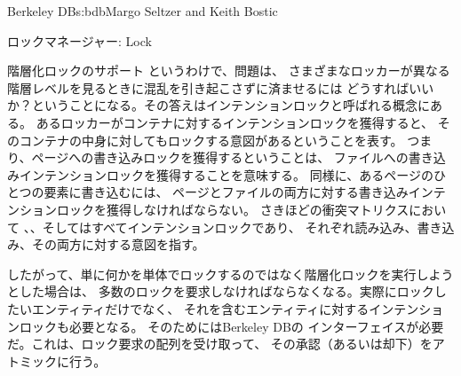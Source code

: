 \begin{aosachapter}{Berkeley DB}{s:bdb}{Margo Seltzer and Keith Bostic}
\begin{aosasect1}{ロックマネージャー: Lock}
\begin{aosasect2}{階層化ロックのサポート}
というわけで、問題は、
さまざまなロッカーが異なる階層レベルを見るときに混乱を引き起こさずに済ませるには
どうすればいいか？ということになる。その答えはインテンションロックと呼ばれる概念にある。
あるロッカーがコンテナに対するインテンションロックを獲得すると、
そのコンテナの中身に対してもロックする意図があるということを表す。
つまり、ページへの書き込みロックを獲得するということは、
ファイルへの書き込みインテンションロックを獲得することを意味する。
同様に、あるページのひとつの要素に書き込むには、
ページとファイルの両方に対する書き込みインテンションロックを獲得しなければならない。
さきほどの衝突マトリクスにおいて
、、そしてはすべてインテンションロックであり、
それぞれ読み込み、書き込み、その両方に対する意図を指す。

したがって、単に何かを単体でロックするのではなく階層化ロックを実行しようとした場合は、
多数のロックを要求しなければならなくなる。実際にロックしたいエンティティだけでなく、
それを含むエンティティに対するインテンションロックも必要となる。
そのためにはBerkeley DBの
インターフェイスが必要だ。これは、ロック要求の配列を受け取って、
その承認（あるいは却下）をアトミックに行う。


\end{aosasect2}
\end{aosasect1}
\end{aosachapter}
